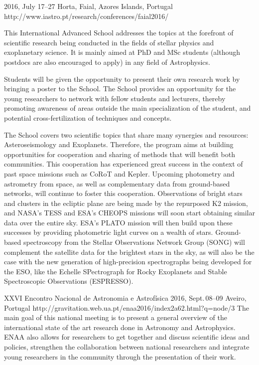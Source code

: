 {2016, July 17--27}%
{Horta, Faial, Azores Islands, Portugal}%
{http://www.iastro.pt/research/conferences/faial2016/}%
{}%
{This International Advanced School addresses the topics at the forefront of scientific research being conducted in the fields of stellar physics and exoplanetary science.
    It is mainly aimed at PhD and MSc students (although postdocs are also encouraged to apply) in any field of Astrophysics.

Students will be given the opportunity to present their own research work by bringing a poster to the School.
The School provides an opportunity for the young researchers to network with fellow students and lecturers, thereby promoting awareness of areas outside the main specialization of the student, and potential cross-fertilization of techniques and concepts.

The School covers two scientific topics that share many synergies and resources: Asteroseismology and Exoplanets.
Therefore, the program aims at building opportunities for cooperation and sharing of methods that will benefit both communities.
This cooperation has experienced great success in the context of past space missions such as CoRoT and Kepler.
Upcoming photometry and astrometry from space, as well as complementary data from ground-based networks, will continue to foster this cooperation.
Observations of bright stars and clusters in the ecliptic plane are being made by the repurposed K2 mission, and NASA's TESS and ESA's CHEOPS missions will soon start obtaining similar data over the entire sky.
ESA's PLATO mission will then build upon these successes by providing photometric light curves on a wealth of stars.
Ground-based spectroscopy from the Stellar Observations Network Group (SONG) will complement the satellite data for the brightest stars in the sky, as will also be the case with the new generation of high-precision spectrographs being developed for the ESO, like the Echelle SPectrograph for Rocky Exoplanets and Stable Spectroscopic Observations (ESPRESSO).}%

 {XXVI Encontro Nacional de Astronomia e Astrofísica}%
{2016, Sept.\,08--09}%
{Aveiro, Portugal}%
{http://gravitation.web.ua.pt/enaa2016/index2a62.html?q=node/3}%
{}%
{The main goal of this national meeting is to present a general overview of the international state of the art research done in Astronomy and Astrophysics.
    ENAA also allows for researchers to get together and discuss scientific ideas and policies, strengthen the collaboration between national researchers and integrate young researchers in the community through the presentation of their work.}


